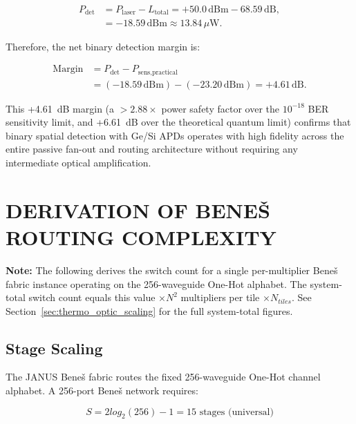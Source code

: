 \documentclass[journal]{IEEEtran}
\begin{document}
\begin{equation}
\begin{aligned}
P_{\text{det}} &= P_{\text{laser}} - L_{\text{total}}
= +50.0\,\text{dBm} - 68.59\,\text{dB},\\
&= -18.59\,\text{dBm} \approx 13.84\,\mu\text{W}.
\end{aligned}
\end{equation}

Therefore, the net binary detection margin is:

\begin{equation}
\begin{aligned}
\text{Margin} &= P_{\text{det}} - P_{\text{sens,practical}} \\
&= (-18.59\,\text{dBm}) - (-23.20\,\text{dBm}) = +4.61\,\text{dB}.
\end{aligned}
\end{equation}

This +4.61~dB margin (a $> 2.88\times$ power safety factor over the $10^{-18}$ BER sensitivity limit, and +6.61~dB over the theoretical quantum limit) confirms that binary spatial detection with Ge/Si APDs operates with high fidelity across the entire passive fan-out and routing architecture without requiring any intermediate optical amplification.

\section{DERIVATION OF BENEŠ ROUTING COMPLEXITY}
\label{app:benes_complexity}

\textbf{Note:} The following derives the switch count for a single per-multiplier Beneš fabric instance operating on the 256-waveguide One-Hot alphabet. The system-total switch count equals this value $\times N^{2}$ multipliers per tile $\times N_{tiles}$. See Section~\ref{sec:thermo_optic_scaling} for the full system-total figures.

\subsection{\textbf{Stage Scaling}}

The JANUS Beneš fabric routes the fixed 256-waveguide One-Hot channel alphabet. A 256-port Beneš network requires:

\begin{equation}
S = 2 log_2(256) - 1 = 15 \text{ stages (universal)}
\end{equation}
\end{document}
